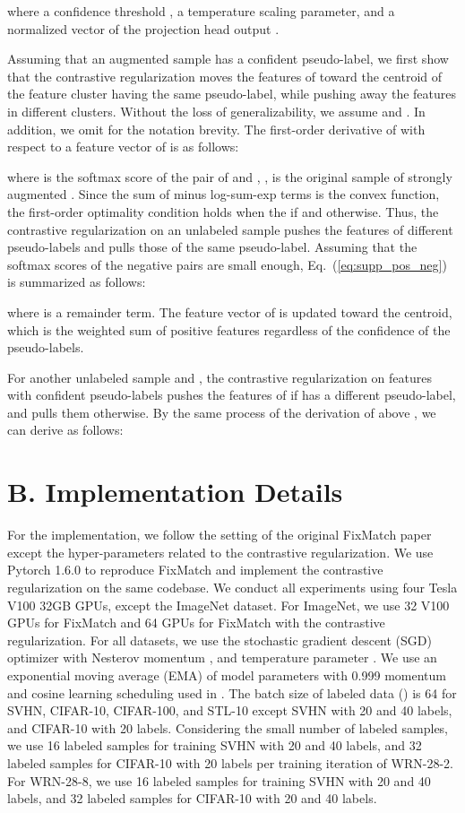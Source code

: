 \documentclass[letterpaper]{article} \usepackage{aaai22}  \usepackage{times}  \usepackage{helvet}  \usepackage{courier}  \usepackage[hyphens]{url}  \usepackage{graphicx} \urlstyle{rm} \def\UrlFont{\rm}  \usepackage{natbib}  \usepackage{caption} \DeclareCaptionStyle{ruled}{labelfont=normalfont,labelsep=colon,strut=off} \frenchspacing  \setlength{\pdfpagewidth}{8.5in}  \setlength{\pdfpageheight}{11in}  \usepackage{algorithm}
\begin{document}
where a confidence threshold , a temperature scaling parameter, and a normalized vector of the projection head output .

Assuming that an augmented sample  has a confident pseudo-label, we first show that the contrastive regularization moves the features of  toward the centroid of the feature cluster having the same pseudo-label, while pushing away the features in different clusters.
Without the loss of generalizability, we assume  and .
In addition, we omit  for the notation brevity.
The first-order derivative of  with respect to a feature vector of  is as follows:

where  is the softmax score of the pair of  and , ,  is the original sample of strongly augmented .
Since the sum of minus log-sum-exp terms is the convex function, the first-order optimality condition holds when the  if  and  otherwise.
Thus, the contrastive regularization on an unlabeled sample pushes the features of different pseudo-labels and pulls those of the same pseudo-label.
Assuming that the softmax scores of the negative pairs are small enough, Eq.~(\ref{eq:supp_pos_neg}) is summarized as follows:

where  is a remainder term.
The feature vector of  is updated toward the centroid, which is the weighted sum of positive features regardless of the confidence of the pseudo-labels.

For another unlabeled sample  and , the contrastive regularization on features with confident pseudo-labels pushes the features of  if  has a different pseudo-label, and pulls them otherwise.
By the same process of the derivation of above , we can derive  as follows:




\section{B. Implementation Details}
For the implementation, we follow the setting of the original FixMatch paper \cite{sohn2020fixmatch} except the hyper-parameters related to the contrastive regularization.
We use Pytorch 1.6.0 to reproduce FixMatch and implement the contrastive regularization on the same codebase.
We conduct all experiments using four Tesla V100 32GB GPUs, except the ImageNet dataset.
For ImageNet, we use 32 V100 GPUs for FixMatch and 64 GPUs for FixMatch with the contrastive regularization.
For all datasets, we use the stochastic gradient descent (SGD) optimizer with Nesterov momentum , and temperature parameter .
We use an exponential moving average (EMA) of model parameters with 0.999 momentum and cosine learning scheduling used in \cite{sohn2020fixmatch}.
The batch size of labeled data () is 64 for SVHN, CIFAR-10, CIFAR-100, and STL-10 except SVHN with 20 and 40 labels, and CIFAR-10 with 20 labels.
Considering the small number of labeled samples, we use 16 labeled samples for training SVHN with 20 and 40 labels, and 32 labeled samples for CIFAR-10 with 20 labels per training iteration of WRN-28-2.
For WRN-28-8, we use 16 labeled samples for training SVHN with 20 and 40 labels, and 32 labeled samples for CIFAR-10 with 20 and 40 labels.
\end{document}
